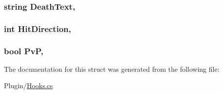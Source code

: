 \subsubsection[{Death\+Text}]{\setlength{\rightskip}{0pt plus 5cm}string Death\+Text\hspace{0.3cm}{\ttfamily [get]}, {\ttfamily [set]}}\label{structOTA_1_1Plugin_1_1HookArgs_1_1PlayerKilled_a6f0a60e64398cf69076e7dd5f338af69}
\hypertarget{structOTA_1_1Plugin_1_1HookArgs_1_1PlayerKilled_a4278e690a1a75136e8ebce3224d47a60}{}
\subsubsection[{Hit\+Direction}]{\setlength{\rightskip}{0pt plus 5cm}int Hit\+Direction\hspace{0.3cm}{\ttfamily [get]}, {\ttfamily [set]}}\label{structOTA_1_1Plugin_1_1HookArgs_1_1PlayerKilled_a4278e690a1a75136e8ebce3224d47a60}
\hypertarget{structOTA_1_1Plugin_1_1HookArgs_1_1PlayerKilled_a1a71271d3ebcb80438bf3637c65755b8}{}
\subsubsection[{Pv\+P}]{\setlength{\rightskip}{0pt plus 5cm}bool Pv\+P\hspace{0.3cm}{\ttfamily [get]}, {\ttfamily [set]}}\label{structOTA_1_1Plugin_1_1HookArgs_1_1PlayerKilled_a1a71271d3ebcb80438bf3637c65755b8}


The documentation for this struct was generated from the following file\+:\begin{DoxyCompactItemize}
\item 
Plugin/\hyperlink{Hooks_8cs}{Hooks.\+cs}\end{DoxyCompactItemize}
